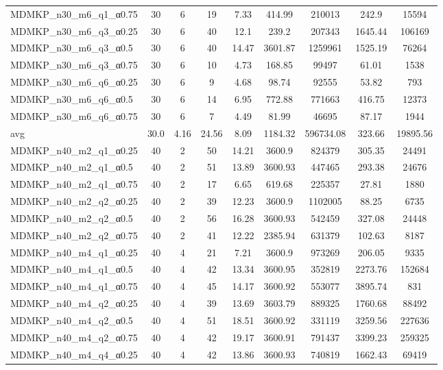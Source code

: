 \begin{table}[!ht]
{\begin{tabular}{lcccccccc}
MDMKP\_n30\_m6\_q1\_α0.75 & 30 & 6 & 19 & 7.33 & 414.99 & 210013 & 242.9 & 15594 \\
MDMKP\_n30\_m6\_q3\_α0.25 & 30 & 6 & 40 & 12.1 & 239.2 & 207343 & 1645.44 & 106169 \\
MDMKP\_n30\_m6\_q3\_α0.5 & 30 & 6 & 40 & 14.47 & 3601.87 & 1259961 & 1525.19 & 76264 \\
MDMKP\_n30\_m6\_q3\_α0.75 & 30 & 6 & 10 & 4.73 & 168.85 & 99497 & 61.01 & 1538 \\
MDMKP\_n30\_m6\_q6\_α0.25 & 30 & 6 & 9 & 4.68 & 98.74 & 92555 & 53.82 & 793 \\
MDMKP\_n30\_m6\_q6\_α0.5 & 30 & 6 & 14 & 6.95 & 772.88 & 771663 & 416.75 & 12373 \\
MDMKP\_n30\_m6\_q6\_α0.75 & 30 & 6 & 7 & 4.49 & 81.99 & 46695 & 87.17 & 1944 \\
\hline avg & 30.0 & 4.16 & 24.56& 8.09 & 1184.32& 596734.08 & 323.66& 19895.56\\ \hline
MDMKP\_n40\_m2\_q1\_α0.25 & 40 & 2 & 50 & 14.21 & 3600.9 & 824379 & 305.35 & 24491 \\
MDMKP\_n40\_m2\_q1\_α0.5 & 40 & 2 & 51 & 13.89 & 3600.93 & 447465 & 293.38 & 24676 \\
MDMKP\_n40\_m2\_q1\_α0.75 & 40 & 2 & 17 & 6.65 & 619.68 & 225357 & 27.81 & 1880 \\
MDMKP\_n40\_m2\_q2\_α0.25 & 40 & 2 & 39 & 12.23 & 3600.9 & 1102005 & 88.25 & 6735 \\
MDMKP\_n40\_m2\_q2\_α0.5 & 40 & 2 & 56 & 16.28 & 3600.93 & 542459 & 327.08 & 24448 \\
MDMKP\_n40\_m2\_q2\_α0.75 & 40 & 2 & 41 & 12.22 & 2385.94 & 631379 & 102.63 & 8187 \\
MDMKP\_n40\_m4\_q1\_α0.25 & 40 & 4 & 21 & 7.21 & 3600.9 & 973269 & 206.05 & 9335 \\
MDMKP\_n40\_m4\_q1\_α0.5 & 40 & 4 & 42 & 13.34 & 3600.95 & 352819 & 2273.76 & 152684 \\
MDMKP\_n40\_m4\_q1\_α0.75 & 40 & 4 & 45 & 14.17 & 3600.92 & 553077 & 3895.74 & 831 \\
MDMKP\_n40\_m4\_q2\_α0.25 & 40 & 4 & 39 & 13.69 & 3603.79 & 889325 & 1760.68 & 88492 \\
MDMKP\_n40\_m4\_q2\_α0.5 & 40 & 4 & 51 & 18.51 & 3600.92 & 331119 & 3259.56 & 227636 \\
MDMKP\_n40\_m4\_q2\_α0.75 & 40 & 4 & 42 & 19.17 & 3600.91 & 791437 & 3399.23 & 259325 \\
MDMKP\_n40\_m4\_q4\_α0.25 & 40 & 4 & 42 & 13.86 & 3600.93 & 740819 & 1662.43 & 69419 \\

\end{tabular}}
\end{table}
